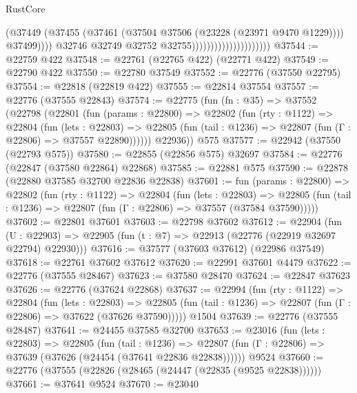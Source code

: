 \begin{lexlean}{RustCore}
\begin{coremodule}
                                                  (@37449
                                                    (@37455
                                                      (@37461
                                                        (@37504
                                                          @37506
                                                          (@23228 (@23971 @9470 @1229))))
                                                      @37499))))
                                              @32746
                                              @32749
                                              @32752
                                              @32755)))))))))))))))))))))
@37544 := @22759 @422
@37548 := @22761 (@22765 @422) (@22771 @422)
@37549 := @22790 @422
@37550 := @22780 @37549
@37552 := @22776 (@37550 @22795)
@37554 := @22818 (@22819 @422)
@37555 := @22814 @37554
@37557 := @22776 (@37555 @22843)
@37574 := @22775
    (fun (fn : @35) =>
    @37552
      (@22798
        (@22801
          (fun (params : @22800) =>
          @22802
            (fun (rty : @1122) =>
            @22804
              (fun (lets : @22803) =>
              @22805 (fun (tail : @1236) => @22807 (fun (Γ : @22806) => @37557 @22890))))))
        @22936))
    @575
@37577 := @22942 (@37550 (@22793 @575))
@37580 := @22855 (@22856 @575) @32697
@37584 := @22776 (@22847 (@37580 @22864) @22868)
@37585 := @22881 @575
@37590 := @22878 (@22880 @37585 @32700 @22836 @22838)
@37601 := fun (params : @22800) =>
  @22802
    (fun (rty : @1122) =>
    @22804
      (fun (lets : @22803) =>
      @22805 (fun (tail : @1236) => @22807 (fun (Γ : @22806) => @37557 (@37584 @37590)))))
@37602 := @22801 @37601
@37603 := @22798 @37602
@37612 := @22904
    (fun (U : @22903) => @22905 (fun (t : @7) => @22913 (@22776 (@22919 @32697 @22794) @22930)))
@37616 := @37577 (@37603 @37612) (@22986 @37549)
@37618 := @22761 @37602 @37612
@37620 := @22991 @37601 @4479
@37622 := @22776 (@37555 @28467)
@37623 := @37580 @28470
@37624 := @22847 @37623
@37626 := @22776 (@37624 @22868)
@37637 := @22994
    (fun (rty : @1122) =>
    @22804
      (fun (lets : @22803) =>
      @22805 (fun (tail : @1236) => @22807 (fun (Γ : @22806) => @37622 (@37626 @37590)))))
    @1504
@37639 := @22776 (@37555 @28487)
@37641 := @24455 @37585 @32700
@37653 := @23016
    (fun (lets : @22803) =>
    @22805
      (fun (tail : @1236) =>
      @22807 (fun (Γ : @22806) => @37639 (@37626 (@24454 (@37641 @22836 @22838))))))
    @9524
@37660 := @22776 (@37555 (@22826 (@28465 (@24447 (@22835 (@9525 @22838))))))
@37661 := @37641 @9524
@37670 := @23040

\end{coremodule}
\end{lexlean}
